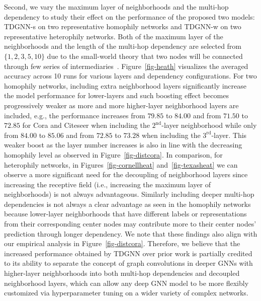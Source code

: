 Second, we vary the maximum layer of neighborhoods and the multi-hop dependency to study their effect on the performance of the proposed two models: TDGNN-s on two representative homophily networks and TDGNN-w on two representative heterophily networks. Both of the maximum layer of the neighborhoods and the length of the multi-hop dependency are selected from $\{1, 2, 3 ,5, 10\}$ due to the small-world theory that two nodes will be connected through few series of intermediaries~\cite{milgram1967small}. Figure~\ref{fig-heath} visualizes the averaged accuracy across 10 runs for various layers and dependency configurations. For two homophily networks, including extra neighborhood layers significantly increase the model performance for lower-layers and such boosting effect becomes progressively weaker as more and more higher-layer neighborhood layers are included, e.g., the performance increases from $79.85$ to $84.00$ and from $71.50$ to $72.85$ for Cora and Citeseer when including the $2^\text{nd}$-layer neighborhood while only from $84.00$ to $85.06$ and from $72.85$ to $73.28$ when including the $3^\text{rd}$-layer. This weaker boost as the layer number increases is also in line with the decreasing homophily level as observed in Figure~\ref{fig-distcora}. In comparison, for heterophily networks, in Figures~\ref{fig-cornellheat} and~\ref{fig-texasheat} we can observe a more significant need for the decoupling of neighborhood layers since increasing the receptive field (i.e., increasing the maximum layer of neighborhoods) is not always advantageous. Similarly including deeper multi-hop dependencies is not always a clear advantage as seen in the homophily networks because lower-layer neighborhoods that have different labels or representations from their corresponding center nodes may contribute more to their center nodes' prediction through longer dependency. We note that these findings also align with our empirical analysis in Figure~\ref{fig-distcora}.
Therefore, we believe that the increased performance obtained by TDGNN over prior work is partially credited to its ability to separate the concept of graph convolutions in deeper GNNs with higher-layer neighborhoods into both multi-hop dependencies and decoupled neighborhood layers, which can allow any deep GNN model to be more flexibly customized via hyperparameter tuning on a wider variety of complex networks.



